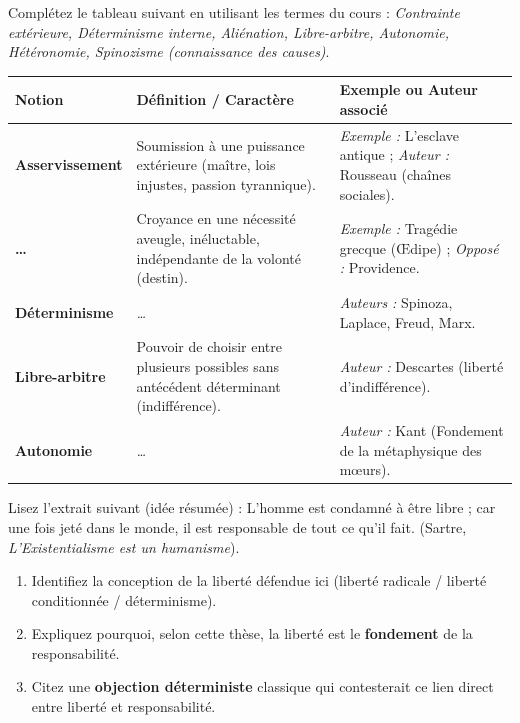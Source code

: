 \documentclass[11pt]{article}
\begin{document}
\begin{exercice}
Complétez le tableau suivant en utilisant les termes du cours : \textit{Contrainte extérieure, Déterminisme interne, Aliénation, Libre-arbitre, Autonomie, Hétéronomie, Spinozisme (connaissance des causes)}.

\begin{tabular}{|>{\raggedright\arraybackslash}p{3.5cm}|>{\raggedright\arraybackslash}p{5.5cm}|>{\raggedright\arraybackslash}p{5.5cm}|}
\hline
\textbf{Notion} & \textbf{Définition / Caractère} & \textbf{Exemple ou Auteur associé} \\
\hline
\textbf{Asservissement} & Soumission à une puissance extérieure (maître, lois injustes, passion tyrannique). & \textit{Exemple :} L'esclave antique ; \textit{Auteur :} Rousseau (chaînes sociales). \\
\hline
\textbf{\dots} & Croyance en une nécessité aveugle, inéluctable, indépendante de la volonté (destin). & \textit{Exemple :} Tragédie grecque (Œdipe) ; \textit{Opposé :} Providence. \\
\hline
\textbf{Déterminisme} & \textit{\dots} & \textit{Auteurs :} Spinoza, Laplace, Freud, Marx. \\
\hline
\textbf{Libre-arbitre} & Pouvoir de choisir entre plusieurs possibles sans antécédent déterminant (indifférence). & \textit{Auteur :} Descartes (liberté d'indifférence). \\
\hline
\textbf{Autonomie} & \textit{\dots} & \textit{Auteur :} Kant (Fondement de la métaphysique des mœurs). \\
\hline
\end{tabular}
\end{exercice}

\begin{exercice}
Lisez l'extrait suivant (idée résumée) : \og L'homme est condamné à être libre ; car une fois jeté dans le monde, il est responsable de tout ce qu'il fait. \fg (Sartre, \textit{L'Existentialisme est un humanisme}).
\begin{enumerate}
    \item Identifiez la conception de la liberté défendue ici (liberté radicale / liberté conditionnée / déterminisme).
    \item Expliquez pourquoi, selon cette thèse, la liberté est le \textbf{fondement} de la responsabilité.
    \item Citez une \textbf{objection déterministe} classique qui contesterait ce lien direct entre liberté et responsabilité.
\end{enumerate}
\end{exercice}
\end{document}

